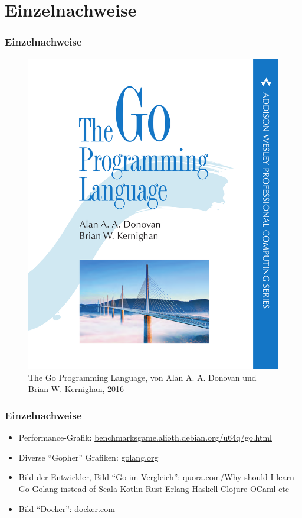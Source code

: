 \documentclass{beamer}
\begin{document}
\section{Einzelnachweise}
\begin{frame}
\frametitle{Einzelnachweise}

\begin{figure}
\includegraphics[scale=0.3]{book.png}
\caption{The Go Programming Language, von Alan A. A. Donovan und Brian W. Kernighan, 2016}
\end{figure}

\end{frame}

\begin{frame}
\frametitle{Einzelnachweise}

\begin{itemize}
\setlength{\itemsep}{20pt}
\item Performance-Grafik: \href{https://benchmarksgame.alioth.debian.org/u64q/go.htmll}{benchmarksgame.alioth.debian.org/u64q/go.html}
\item Diverse ``Gopher'' Grafiken: \href{https://golang.org/}{golang.org}
\item Bild der Entwickler, Bild ``Go im Vergleich'': \href{https://www.quora.com/Why-should-I-learn-Go-Golang-instead-of-Scala-Kotlin-Rust-Erlang-Haskell-Clojure-OCaml-etc}{quora.com/Why-should-I-learn-Go-Golang-instead-of-Scala-Kotlin-Rust-Erlang-Haskell-Clojure-OCaml-etc}
\item Bild ``Docker'': \href{https://www.docker.com/}{docker.com}
\end{itemize}

\end{frame}
\end{document}
